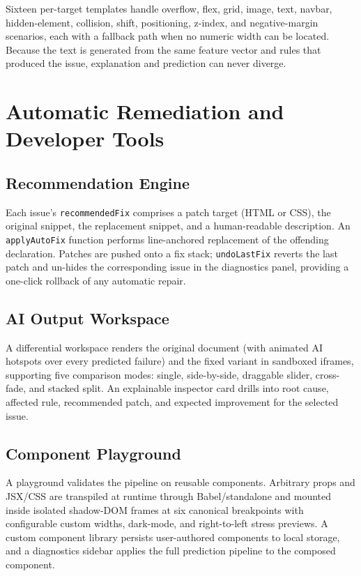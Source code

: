 \documentclass[conference]{IEEEtran}
\begin{document}
Sixteen per-target templates handle overflow, flex, grid, image, text,
navbar, hidden-element, collision, shift, positioning, z-index, and
negative-margin scenarios, each with a fallback path when no numeric
width can be located. Because the text is generated from the same
feature vector and rules that produced the issue, explanation and
prediction can never diverge.

\section{Automatic Remediation and Developer Tools}

\subsection{Recommendation Engine}
Each issue's \texttt{recommendedFix} comprises a patch target
(HTML or CSS), the original snippet, the replacement snippet, and a
human-readable description. An \texttt{applyAutoFix} function performs
line-anchored replacement of the offending declaration. Patches are
pushed onto a fix stack; \texttt{undoLastFix} reverts the last patch and
un-hides the corresponding issue in the diagnostics panel, providing a
one-click rollback of any automatic repair.

\subsection{AI Output Workspace}
A differential workspace renders the original document (with animated
AI hotspots over every predicted failure) and the fixed variant in
sandboxed iframes, supporting five comparison modes: single, side-by-side,
draggable slider, cross-fade, and stacked split. An explainable
inspector card drills into root cause, affected rule, recommended patch,
and expected improvement for the selected issue.

\subsection{Component Playground}
A playground validates the pipeline on reusable components. Arbitrary
props and JSX/CSS are transpiled at runtime through Babel/standalone
\cite{babel2015} and mounted inside isolated shadow-DOM frames at six
canonical breakpoints with configurable custom widths, dark-mode, and
right-to-left stress previews. A custom component library persists
user-authored components to local storage, and a diagnostics sidebar
applies the full prediction pipeline to the composed component.
\end{document}
